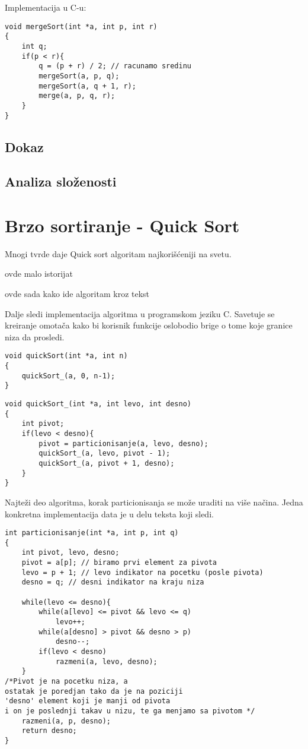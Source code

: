 \documentclass{memoir}
\begin{document}
Implementacija u C-u:
\begin{lstlisting}
void mergeSort(int *a, int p, int r)
{
	int q;
	if(p < r){
		q = (p + r) / 2; // racunamo sredinu
		mergeSort(a, p, q); 
		mergeSort(a, q + 1, r);
		merge(a, p, q, r);
	}
}
\end{lstlisting}

\subsection{Dokaz}
\subsection{Analiza složenosti}

\section{Brzo sortiranje - Quick Sort}
Mnogi tvrde daje Quick sort algoritam najkorišćeniji na svetu. 

ovde malo istorijat

ovde sada kako ide algoritam kroz tekst

Dalje sledi implementacija algoritma u programskom jeziku C. Savetuje se kreiranje omotača kako bi korisnik funkcije 
oslobodio brige o tome koje granice niza da prosledi.
\begin{lstlisting}
void quickSort(int *a, int n)
{
	quickSort_(a, 0, n-1);
}
\end{lstlisting}

\begin{lstlisting}
void quickSort_(int *a, int levo, int desno)
{
	int pivot;
	if(levo < desno){
		pivot = particionisanje(a, levo, desno);
		quickSort_(a, levo, pivot - 1);
		quickSort_(a, pivot + 1, desno);
	}
}
\end{lstlisting}

Najteži deo algoritma, korak particionisanja se može uraditi na više načina. Jedna konkretna implementacija data je u 
delu teksta koji sledi.

\begin{lstlisting}
int particionisanje(int *a, int p, int q)
{
	int pivot, levo, desno;
	pivot = a[p]; // biramo prvi element za pivota
	levo = p + 1; // levo indikator na pocetku (posle pivota)
	desno = q; // desni indikator na kraju niza
	
	while(levo <= desno){
		while(a[levo] <= pivot && levo <= q)
			levo++;
		while(a[desno] > pivot && desno > p)
			desno--;
		if(levo < desno)
			razmeni(a, levo, desno);
	}
/*Pivot je na pocetku niza, a  
ostatak je poredjan tako da je na poziciji
'desno' element koji je manji od pivota
i on je poslednji takav u nizu, te ga menjamo sa pivotom */
	razmeni(a, p, desno);
	return desno;
}
\end{lstlisting}
\end{document}
